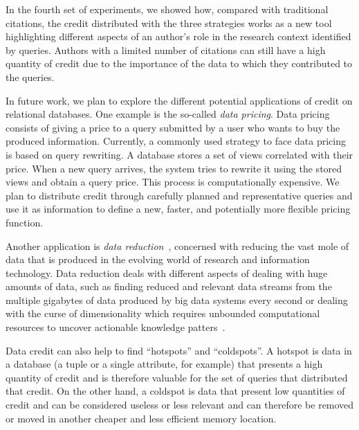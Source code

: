 In the fourth set of experiments, we showed how, compared with traditional citations, the credit distributed with the three strategies works as a new tool highlighting different aspects of an author's role in the research context identified by queries. Authors with a limited number of citations can still have a high quantity of credit due to the importance of the data to which they contributed to the queries. 

In future work, we plan to explore the different potential applications of credit on relational databases.
One example is the so-called \emph{data pricing}. Data pricing consists of giving a price to a query submitted by a user who wants to buy the produced information. Currently, a commonly used strategy to face data pricing is based on query rewriting. A database stores a set of views correlated with their price. When a new query arrives, the system tries to rewrite it using the stored views and obtain a query price. This process is computationally expensive.
We plan to distribute credit through carefully planned and representative queries and use it as information to define a new, faster, and potentially more flexible pricing function.

Another application is \emph{data reduction}~\cite{milo2019getting}, concerned with reducing the vast mole of data that is produced in the evolving world of research and information technology. Data reduction deals with different aspects of dealing with huge amounts of data, such as finding reduced and relevant data streams from the multiple gigabytes of data produced by big data systems every second or dealing with the curse of dimensionality which requires unbounded computational resources to uncover actionable knowledge patters~\citep{ur2016big}.

Data credit can also help to find ``hotspots'' and ``coldspots''. A hotspot is data in a database (a tuple or a single attribute, for example) that presents a high quantity of credit and is therefore valuable for the set of queries that distributed that credit. 
On the other hand, a coldspot is data that present low quantities of credit and can be considered useless or less relevant and can therefore be removed or moved in another cheaper and less efficient memory location. 
